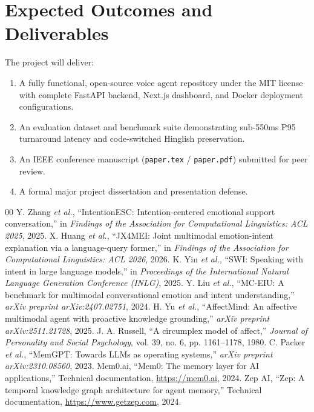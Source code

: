 \documentclass[12pt,a4paper]{article}
\begin{document}
\section{Expected Outcomes and Deliverables}
The project will deliver:
\begin{enumerate}[leftmargin=*]
    \item A fully functional, open-source voice agent repository under the MIT license with complete FastAPI backend, Next.js dashboard, and Docker deployment configurations.
    \item An evaluation dataset and benchmark suite demonstrating sub-550ms P95 turnaround latency and code-switched Hinglish preservation.
    \item An IEEE conference manuscript (\texttt{paper.tex} / \texttt{paper.pdf}) submitted for peer review.
    \item A formal major project dissertation and presentation defense.
\end{enumerate}

\begingroup
\small
\setlength{\itemsep}{2pt}
\begin{thebibliography}{00}
 Y. Zhang \emph{et al.}, ``IntentionESC: Intention-centered emotional support conversation,'' in \emph{Findings of the Association for Computational Linguistics: ACL 2025}, 2025.
 X. Huang \emph{et al.}, ``JX4MEI: Joint multimodal emotion-intent explanation via a language-query former,'' in \emph{Findings of the Association for Computational Linguistics: ACL 2026}, 2026.
 K. Yin \emph{et al.}, ``SWI: Speaking with intent in large language models,'' in \emph{Proceedings of the International Natural Language Generation Conference (INLG)}, 2025.
 Y. Liu \emph{et al.}, ``MC-EIU: A benchmark for multimodal conversational emotion and intent understanding,'' \emph{arXiv preprint arXiv:2407.02751}, 2024.
 H. Yu \emph{et al.}, ``AffectMind: An affective multimodal agent with proactive knowledge grounding,'' \emph{arXiv preprint arXiv:2511.21728}, 2025.
 J. A. Russell, ``A circumplex model of affect,'' \emph{Journal of Personality and Social Psychology}, vol. 39, no. 6, pp. 1161--1178, 1980.
 C. Packer \emph{et al.}, ``MemGPT: Towards LLMs as operating systems,'' \emph{arXiv preprint arXiv:2310.08560}, 2023.
 Mem0.ai, ``Mem0: The memory layer for AI applications,'' Technical documentation, \url{https://mem0.ai}, 2024.
 Zep AI, ``Zep: A temporal knowledge graph architecture for agent memory,'' Technical documentation, \url{https://www.getzep.com}, 2024.
\end{thebibliography}
\endgroup
\end{document}

